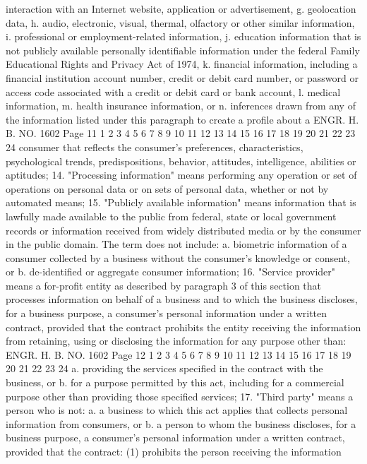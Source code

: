 interaction with an Internet website, application
or advertisement,
g. geolocation data,
h. audio, electronic, visual, thermal, olfactory or other
similar information,
i. professional or employment-related information,
j. education information that is not publicly available
personally identifiable information under the federal
Family Educational Rights and Privacy Act of 1974,
k. financial information, including a financial
institution account number, credit or debit card
number, or password or access code associated with a
credit or debit card or bank account,
l. medical information,
m. health insurance information, or
n. inferences drawn from any of the information listed
under this paragraph to create a profile about a 
ENGR. H. B. NO. 1602 Page 11
1
2
3
4
5
6
7
8
9
10
11
12
13
14
15
16
17
18
19
20
21
22
23
24
consumer that reflects the consumer's preferences,
characteristics, psychological trends,
predispositions, behavior, attitudes, intelligence,
abilities or aptitudes;
14. "Processing information" means performing any operation or
set of operations on personal data or on sets of personal data,
whether or not by automated means;
15. "Publicly available information" means information that is
lawfully made available to the public from federal, state or local
government records or information received from widely distributed
media or by the consumer in the public domain. The term does not
include:
a. biometric information of a consumer collected by a
business without the consumer's knowledge or consent,
or
b. de-identified or aggregate consumer information;
16. "Service provider" means a for-profit entity as described
by paragraph 3 of this section that processes information on behalf
of a business and to which the business discloses, for a business
purpose, a consumer's personal information under a written contract,
provided that the contract prohibits the entity receiving the
information from retaining, using or disclosing the information for
any purpose other than:
ENGR. H. B. NO. 1602 Page 12
1
2
3
4
5
6
7
8
9
10
11
12
13
14
15
16
17
18
19
20
21
22
23
24
a. providing the services specified in the contract with
the business, or
b. for a purpose permitted by this act, including for a
commercial purpose other than providing those
specified services;
17. "Third party" means a person who is not:
a. a business to which this act applies that collects
personal information from consumers, or
b. a person to whom the business discloses, for a
business purpose, a consumer's personal information
under a written contract, provided that the contract:
(1) prohibits the person receiving the information

